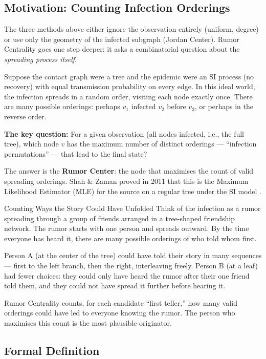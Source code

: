 \subsection{Motivation: Counting Infection Orderings}

The three methods above either ignore the observation entirely (uniform, degree) or
use only the geometry of the infected subgraph (Jordan Center). Rumor Centrality goes
one step deeper: it asks a combinatorial question about the \textit{spreading process
itself}.

Suppose the contact graph were a tree and the epidemic were an SI process (no recovery)
with equal transmission probability on every edge. In this ideal world, the infection
spreads in a random order, visiting each node exactly once. There are many possible
orderings: perhaps $v_1$ infected $v_2$ before $v_3$, or perhaps in the reverse order.

\textbf{The key question:} For a given observation (all nodes infected, i.e., the full
tree), which node $v$ has the maximum number of distinct orderings --- ``infection
permutations'' --- that lead to the final state?

The answer is the \textbf{Rumor Center}: the node that maximises the count of valid
spreading orderings. Shah \& Zaman proved in 2011 that this is the Maximum Likelihood
Estimator (MLE) for the source on a regular tree under the SI model
\cite{Shah2011}.

\begin{analogybox}{Counting Ways the Story Could Have Unfolded}
Think of the infection as a rumor spreading through a group of friends arranged in a
tree-shaped friendship network. The rumor starts with one person and spreads outward.
By the time everyone has heard it, there are many possible orderings of who told whom
first.

Person A (at the center of the tree) could have told their story in many sequences
--- first to the left branch, then the right, interleaving freely. Person B (at a
leaf) had fewer choices: they could only have heard the rumor after their one friend
told them, and they could not have spread it further before hearing it.

Rumor Centrality counts, for each candidate ``first teller,'' how many valid orderings
could have led to everyone knowing the rumor. The person who maximises this count is
the most plausible originator.
\end{analogybox}

\subsection{Formal Definition}

